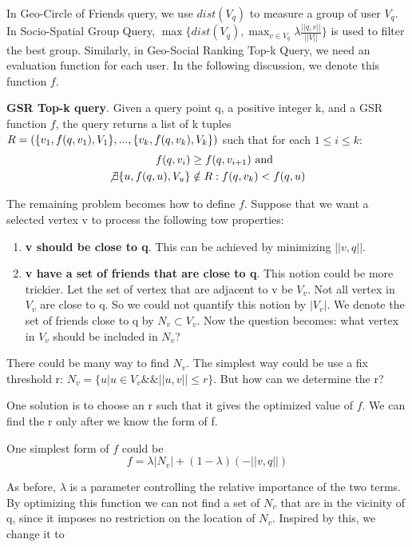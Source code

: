 In Geo-Circle of Friends query, we use $dist(V_q)$ to measure a group of user $V_q$. In Socio-Spatial Group Query, $\max \{dist(V_q), \max_{v \in V_q} \lambda \frac{||q,v||}{||V||}\}$ is used to filter the best group. Similarly, in Geo-Social Ranking Top-k Query, we need an evaluation function for each user. In the following discussion, we denote this function $f$.

\textbf{GSR Top-k query}. Given a query point q, a positive integer k, and a GSR function $f$, the query returns a list of k tuples $R = (\{ v_1, f(q, v_1), V_1 \}, ..., \\ \{ v_k, f(q, v_k), V_k\})$ such that for each $1 \le i \le k$:
\begin{align}
f(q,v_i) & \ge f(q,v_{i + 1}) \mbox{ and} \\
\not \exists \{u,f(q,u),V_u \} & \notin R: f(q,v_k) < f(q,u)
\end{align}

The remaining problem becomes how to define $f$. Suppose that we want a selected vertex v to process the following tow properties:
\begin{enumerate}
\item \textbf{v should be close to q}. This can be achieved by minimizing $||v,q||$. 
\item \textbf{v have a set of friends that are close to q}. This notion could be more trickier. Let the set of vertex that are adjacent to v be $V_v$. Not all vertex in $V_v$ are close to q. So we could not quantify this notion by $|V_v|$. We denote the set of friends close to q by $N_v \subset V_v$. Now the question becomes: what vertex in $V_v$ should be included in $N_v$?
\end{enumerate}

There could be many way to find $N_v$. The simplest way could be use a fix threshold r: $N_v = \{ u | u \in V_v \& \& ||u,v|| \le r\}$. But how can we determine the r?

One solution is to choose an r such that it gives the optimized value of $f$. We can find the r only after we know the form of f. 

One simplest form of $f$ could be 
\begin{equation}
f = \lambda |N_v| + (1 - \lambda) (- ||v,q||)
\end{equation}

As before, $\lambda$ is a parameter controlling the relative importance of the two terms. By optimizing this function we can not find a set of $N_v$ that are in the vicinity of q, since it imposes no restriction on the location of $N_v$. Inspired by this, we change it to 

